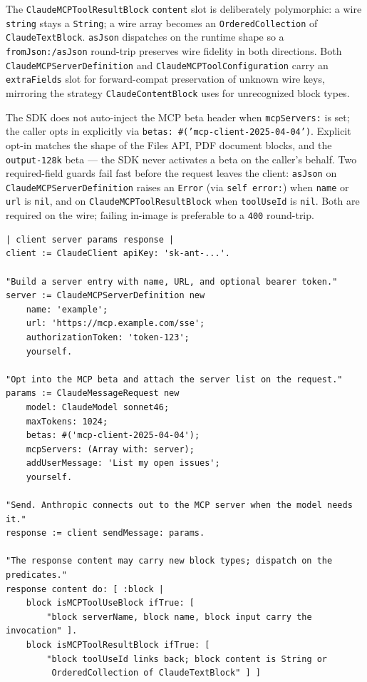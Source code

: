 \documentclass[a4paper,10pt,fleqn]{article}
\begin{document}
The \texttt{ClaudeMCPToolResultBlock} \texttt{content} slot is
deliberately polymorphic: a wire \texttt{string} stays a
\texttt{String}; a wire array becomes an
\texttt{OrderedCollection} of \texttt{ClaudeTextBlock}.
\texttt{asJson} dispatches on the runtime shape so a
\texttt{fromJson:/asJson} round-trip preserves wire fidelity in
both directions.  Both \texttt{ClaudeMCPServerDefinition} and
\texttt{ClaudeMCPToolConfiguration} carry an \texttt{extraFields}
slot for forward-compat preservation of unknown wire keys,
mirroring the strategy \texttt{ClaudeContentBlock} uses for
unrecognized block types.

The SDK does not auto-inject the MCP beta header when
\texttt{mcpServers:} is set; the caller opts in explicitly via
\texttt{betas: \#('mcp-client-2025-04-04')}.  Explicit opt-in
matches the shape of the Files API, PDF document blocks, and the
\texttt{output-128k} beta --- the SDK never activates a beta on
the caller's behalf.  Two required-field guards fail fast before
the request leaves the client: \texttt{asJson} on
\texttt{ClaudeMCPServerDefinition} raises an \texttt{Error} (via
\texttt{self error:}) when \texttt{name} or \texttt{url} is
\texttt{nil}, and on \texttt{ClaudeMCPToolResultBlock} when
\texttt{toolUseId} is \texttt{nil}.  Both are required on the
wire; failing in-image is preferable to a \texttt{400} round-trip.

\begin{lstlisting}[language={}]
| client server params response |
client := ClaudeClient apiKey: 'sk-ant-...'.

"Build a server entry with name, URL, and optional bearer token."
server := ClaudeMCPServerDefinition new
    name: 'example';
    url: 'https://mcp.example.com/sse';
    authorizationToken: 'token-123';
    yourself.

"Opt into the MCP beta and attach the server list on the request."
params := ClaudeMessageRequest new
    model: ClaudeModel sonnet46;
    maxTokens: 1024;
    betas: #('mcp-client-2025-04-04');
    mcpServers: (Array with: server);
    addUserMessage: 'List my open issues';
    yourself.

"Send. Anthropic connects out to the MCP server when the model needs it."
response := client sendMessage: params.

"The response content may carry new block types; dispatch on the predicates."
response content do: [ :block |
    block isMCPToolUseBlock ifTrue: [
        "block serverName, block name, block input carry the invocation" ].
    block isMCPToolResultBlock ifTrue: [
        "block toolUseId links back; block content is String or
         OrderedCollection of ClaudeTextBlock" ] ]
\end{lstlisting}
\end{document}
